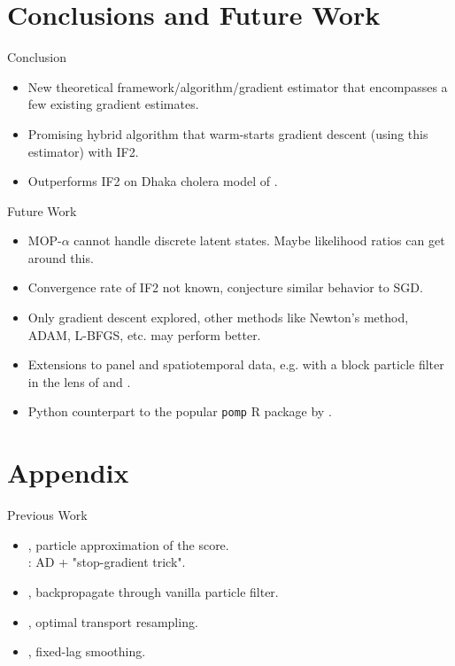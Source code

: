 \documentclass{beamer}
\begin{document}
\section{Conclusions and Future Work}

\begin{frame}{Conclusion}
    \begin{itemize}
        \item New theoretical framework/algorithm/gradient estimator that encompasses a few existing gradient estimates.
        \item \pause Promising hybrid algorithm that warm-starts gradient descent (using this estimator) with IF2.
        \item \pause Outperforms IF2 on Dhaka cholera model of \cite{king15}.
    \end{itemize}
\end{frame}


\begin{frame}{Future Work}
    \begin{itemize}
        \item MOP-$\alpha$ cannot handle discrete latent states. Maybe likelihood ratios can get around this.
        \item \pause Convergence rate of IF2 not known, conjecture similar behavior to SGD. 
        \item \pause Only gradient descent explored, other methods like Newton's method, ADAM, L-BFGS, etc. may perform better.
        \item \pause Extensions to panel and spatiotemporal data, e.g. with a block particle filter in the lens of \cite{ionides22} and \cite{ning23}.
        \item \pause Python counterpart to the popular \texttt{pomp} R package by \citet{king16, king2017pompmanual}.
    \end{itemize}
\end{frame}





\appendix
\section{Appendix}


\begin{frame}{Previous Work}

    
    \begin{itemize}
        \item \cite{poyiadjis11}, particle approximation of the score. \pause \\ \cite{scibior21}: AD + "stop-gradient trick". 
        \item 
        \pause \cite{blei2018vsmc}, backpropagate through vanilla particle filter.
        \item 
        \pause \cite{corenflos21}, optimal transport resampling.
        \item 
        \pause \cite{singh22}, fixed-lag smoothing.
    \end{itemize}
\end{frame}
\end{document}
